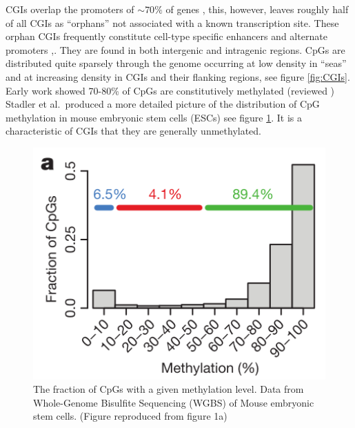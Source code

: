 \documentclass[
]{book}
\begin{document}
CGIs overlap the promoters of \(\sim70\%\) of genes \citep{Saxonov2006}, this, however, leaves roughly half of all CGIs as ``orphans'' not associated with a known transcription site. These orphan CGIs frequently constitute cell-type specific enhancers \citep{Bell2017} and alternate promoters \citep{Illingworth2010},\citep{Maunakea2010}. They are found in both intergenic and intragenic regions. CpGs are distributed quite sparsely through the genome occurring at low density in ``seas'' and at increasing density in CGIs and their flanking regions, see figure \ref{fig:CGIs}. Early work showed 70-80\% of CpGs are constitutively methylated \citep{Ehrlich1982} (reviewed \citet{Bird2002}) Stadler et al.~produced a more detailed picture of the distribution of CpG methylation in mouse embryonic stem cells (ESCs) \citep{Stadler2011} see figure \ref{fig:CpGfreqVsDNAm}. It is a characteristic of CGIs that they are generally unmethylated.

\begin{figure}
\includegraphics[width=5.81in]{figs/CpGfreqVsDNAm} \caption{The fraction of CpGs with a given methylation level. Data from Whole-Genome Bisulfite Sequencing (WGBS) of Mouse embryonic stem cells. (Figure reproduced from \citet{Stadler2011} figure 1a)}\label{fig:CpGfreqVsDNAm}
\end{figure}
\end{document}
